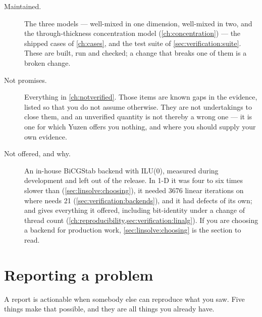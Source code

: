 \begin{description}
  \item[Maintained.] The three models --- well-mixed in one dimension,
    well-mixed in two, and the through-thickness concentration model
     (\cref{ch:concentration}) --- the shipped cases of
    \cref{ch:cases}, and the test suite of \cref{sec:verification:suite}. These
    are built, run and checked; a change that breaks one of them is a broken
    change.
  \item[Not promises.] Everything in \cref{ch:notverified}. Those items are
    known gaps in the evidence, listed so that you do not assume otherwise.
    They are not undertakings to close them, and an unverified quantity is not
    thereby a wrong one --- it is one for which Yuzen offers you nothing, and
    where you should supply your own evidence.
  \item[Not offered, and why.] An in-house BiCGStab backend with ILU(0),
    measured during development and left out of the release. In 1-D it was
    four to six times slower than 
    (\cref{sec:linsolve:choosing}), it needed 3676 linear iterations on
     where  needs 21
    (\cref{sec:verification:backends}), and it had defects of its own; and
     gives everything it offered, including bit-identity under
    a change of thread count
    (\cref{ch:reproducibility,sec:verification:linalg}). If you are choosing
    a backend for production work,
    \cref{sec:linsolve:choosing} is the section to read.
\end{description}

\section{Reporting a problem}
\label{sec:policy:reporting}

A report is actionable when somebody else can reproduce what you saw. Five
things make that possible, and they are all things you already have.

